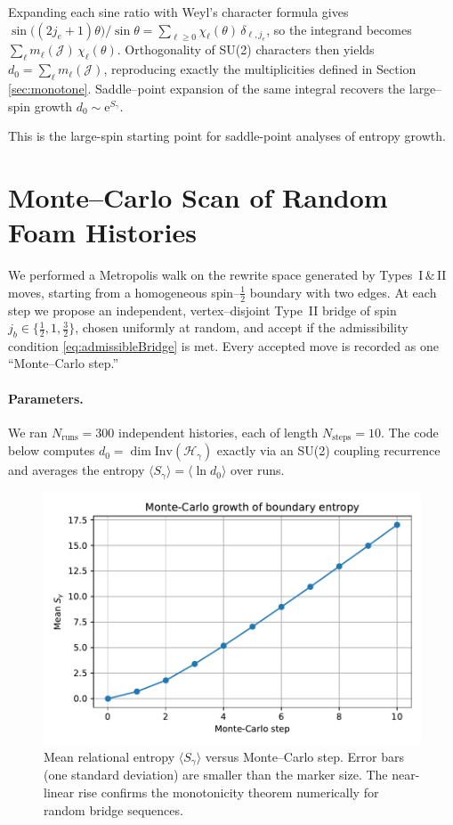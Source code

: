 \documentclass[11pt]{article}
\newcommand{\Hil}{\mathcal{H}}
\newcommand{\Inv}{\mathrm{Inv}}
\newcommand{\Cut}{\gamma}
\newcommand{\JS}{\mathcal{J}} %
\begin{document}
\smallskip
\noindent
Expanding each sine ratio with Weyl's character formula gives
\(\sin\bigl((2j_e+1)\theta\bigr)\big/\sin\theta=\sum_{\ell\ge0}\chi_\ell(\theta)\,\delta_{\ell,j_e}\),
so the integrand becomes \(\sum_{\ell}m_\ell(\JS)\,\chi_\ell(\theta)\).
Orthogonality of SU(2) characters then yields
\(d_0=\sum_{\ell}m_\ell(\JS)\), reproducing exactly the multiplicities
defined in Section \ref{sec:monotone}.  Saddle–point expansion of the same
integral recovers the large–spin growth
\(d_0\sim\mathrm e^{S_{\Cut}}\).

This is the large-spin starting point for saddle-point analyses of entropy growth.

\section{Monte--Carlo Scan of Random Foam Histories}\label{app:MC}

We performed a Metropolis walk on the rewrite space generated by
Types~I\,\&\,II moves, starting from a homogeneous
spin--$\tfrac12$ boundary with two edges.  At each step we propose an
independent, vertex–disjoint Type~II bridge of spin
$j_b\in\{\tfrac12,1,\tfrac32\}$, chosen uniformly at random, and accept
if the admissibility condition \eqref{eq:admissibleBridge} is met.
Every accepted move is recorded as one “Monte--Carlo step.”

\paragraph{Parameters.}
We ran $N_{\text{runs}}=300$ independent histories, each of length
$N_{\text{steps}}=10$.  The code below computes
$d_0=\dim\!\Inv(\Hil_\gamma)$ exactly via an SU(2) coupling
recurrence and averages the entropy
$\langle S_\gamma\rangle =\langle \ln d_0\rangle$ over runs.

\begin{figure}[!htbp]
  \centering
  \includegraphics[width=.75\linewidth]{figures/mc_entropy_growth.pdf}
  \caption{Mean relational entropy $\langle S_\gamma\rangle$ versus
           Monte--Carlo step.  Error bars (one standard deviation) are
           smaller than the marker size.  The near-linear rise confirms
           the monotonicity theorem numerically for random bridge
           sequences.}
  \label{fig:MCgrowth}
\end{figure}
\end{document}
